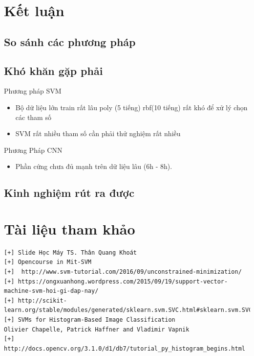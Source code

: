 \documentclass[a4paper,12pt]{report}
\begin{document}
\chapter{Kết luận}
\section{So sánh các phương pháp}
\section{Khó khăn gặp phải}
Phương pháp SVM
\begin{itemize}
\item Bộ dữ liệu lớn train rất lâu poly (5 tiếng) rbf(10 tiếng) rất khó để xử lý chọn các tham số 
\item SVM rất nhiều tham số cần phải thử nghiệm rất nhiều
\end{itemize}
Phương Pháp CNN
\begin{itemize}
\item Phần cứng chưa đủ mạnh trên dữ liệu lâu (6h - 8h).
\end{itemize}
\section{Kinh nghiệm rút ra được}
\chapter{Tài liệu tham khảo}
\begin{verbatim}
[+] Slide Học Máy TS. Thân Quang Khoát
[+] Opencourse in Mit-SVM 
[+]  http://www.svm-tutorial.com/2016/09/unconstrained-minimization/
[+] https://ongxuanhong.wordpress.com/2015/09/19/support-vector-machine-svm-hoi-gi-dap-nay/
[+] http://scikit-learn.org/stable/modules/generated/sklearn.svm.SVC.html#sklearn.svm.SVC 
[+] SVMs for Histogram-Based Image Classification
Olivier Chapelle, Patrick Haffner and Vladimir Vapnik
[+] http://docs.opencv.org/3.1.0/d1/db7/tutorial_py_histogram_begins.html


\end{verbatim}
\end{document}

